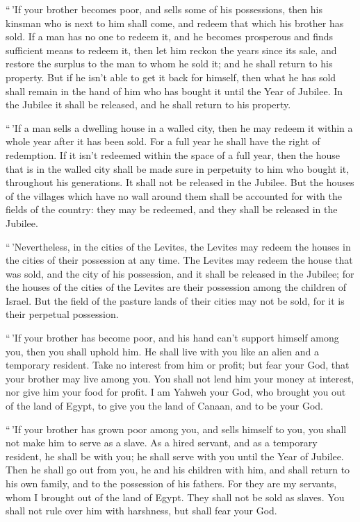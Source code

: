 ``\,'If your brother becomes poor, and sells some of his
possessions, then his kinsman who is next to him shall come, and redeem
that which his brother has sold.  If a man has no one to
redeem it, and he becomes prosperous and finds sufficient means to
redeem it,  then let him reckon the years since its sale,
and restore the surplus to the man to whom he sold it; and he shall
return to his property.  But if he isn't able to get it
back for himself, then what he has sold shall remain in the hand of him
who has bought it until the Year of Jubilee. In the Jubilee it shall be
released, and he shall return to his property.

 ``\,'If a man sells a dwelling house in a walled city,
then he may redeem it within a whole year after it has been sold. For a
full year he shall have the right of redemption.  If it
isn't redeemed within the space of a full year, then the house that is
in the walled city shall be made sure in perpetuity to him who bought
it, throughout his generations. It shall not be released in the Jubilee.
 But the houses of the villages which have no wall around
them shall be accounted for with the fields of the country: they may be
redeemed, and they shall be released in the Jubilee.

 ``\,'Nevertheless, in the cities of the Levites, the
Levites may redeem the houses in the cities of their possession at any
time.  The Levites may redeem the house that was sold,
and the city of his possession, and it shall be released in the Jubilee;
for the houses of the cities of the Levites are their possession among
the children of Israel.  But the field of the pasture
lands of their cities may not be sold, for it is their perpetual
possession.

 ``\,'If your brother has become poor, and his hand can't
support himself among you, then you shall uphold him. He shall live with
you like an alien and a temporary resident.  Take no
interest from him or profit; but fear your God, that your brother may
live among you.  You shall not lend him your money at
interest, nor give him your food for profit.  I am Yahweh
your God, who brought you out of the land of Egypt, to give you the land
of Canaan, and to be your God.

 ``\,'If your brother has grown poor among you, and sells
himself to you, you shall not make him to serve as a slave.
 As a hired servant, and as a temporary resident, he
shall be with you; he shall serve with you until the Year of Jubilee.
 Then he shall go out from you, he and his children with
him, and shall return to his own family, and to the possession of his
fathers.  For they are my servants, whom I brought out of
the land of Egypt. They shall not be sold as slaves.  You
shall not rule over him with harshness, but shall fear your God.

